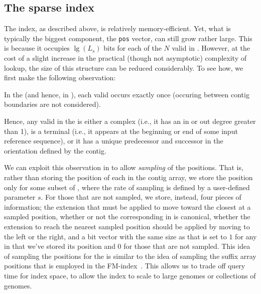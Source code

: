 \subsection*{The sparse \pufferfish index}

The \pufferfish index, as described above, is relatively memory-efficient. Yet, what
is typically the biggest component, the \texttt{pos} vector, can still grow rather
large. This is because it occupies $\lg(L_s)$ bits for each of the $N$ valid
\kmers in \cseq. However, at the cost of a slight increase in the practical
(though not asymptotic) complexity of lookup, the size of this structure can be
reduced considerably. To see how, we first make the following observation:

\begin{observation}
  In the \ccdbg (and hence, in \cseq), each valid \kmer occurs exactly once (\kmers occuring between contig boundaries are not considered).
\end{observation}

Hence, any valid \kmer in the \ccdbg is either a complex \kmer (i.e., it has an
in or out degree greater than 1), is a terminal \kmer (i.e., it appears at the
beginning or end of some input reference sequence), or it has a unique
predecessor and successor in the orientation defined by the contig.

We can exploit this observation in \pufferfish to allow \emph{sampling} of the \kmer
positions. That is, rather than storing the position of each \kmer in the contig
array, we store the position only for some subset of \kmers, where the rate of
sampling is defined by a user-defined parameter $s$. For those \kmers that are
not sampled, we store, instead, four pieces of information; the extension that
must be applied to move toward the closest \kmer at a sampled position, whether
or not the corresponding \kmer in \cseq is canonical, whether the extension
to reach the nearest sampled position should be applied by moving to the left or
the right, and a bit vector with the same size as \cseq
that is set to $1$ for any \kmer in \cseq that we've stored its position and $0$
for those that are not sampled.
This idea of sampling the positions for the \kmers is similar to the
idea of sampling the suffix array positions that is employed in the
FM-index~\cite{Ferragina2001Experimental}. This allows us to trade off query
time for index space, to allow the \pufferfish index to scale to large genomes or
collections of genomes. 


